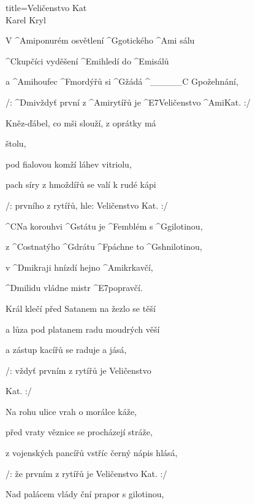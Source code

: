 \begin{song}{title=\predtitle\centering Veličenstvo Kat \\\large Karel Kryl  \vspace*{-0.3cm}}  %
\begin{centerjustified}

\begin{varwidth}[t]{0.55\textwidth}\setlength{\parindent}{\pindent}  %

\sloka
	V ^{Ami\z}ponurém osvětlení ^{G\z}gotického ^{Ami\,\,}sálu
 
	^{C\z}kupčíci vyděšení ^{Emi\z}hledí do ^{E}misálů

	a ^{Ami\z}houfec ^{F\z}mordýřů si ^{G\z}žádá ^{{\color{white}\_\_\_\_\_}C\,\,G}požehnání,
         
	/: ^{Dmi\z}vždyť první z ^{Ami\z}rytířů je ^{E7\z}Veličenstvo ^{Ami}Kat. :/

\sloka
	Kněz-ďábel, co mši slouží, z oprátky má 

	štolu,
	
	pod fialovou komží láhev vitriolu,
	
	pach síry z hmoždířů se valí k rudé kápi

	/: prvního z rytířů, hle: Veličenstvo Kat. :/
	
	
	^{C}Na korouhvi ^{G\z}státu je ^{F\z}emblém s ^{G}gilotinou,

	z ^{C\z}ostnatýho ^{G\z}drátu ^{F\z}páchne to ^{\z G}shnilotinou,

	v ^{Dmi\z}kraji hnízdí hejno ^{\z Ami}krkavčí,

	^{Dmi\z}lidu vládne mistr ^{\z E7}popravčí.

\sloka
	Král klečí před Satanem na žezlo se těší
   
	a lůza pod platanem radu moudrých věší

	a zástup kacířů se raduje a jásá,
 	
 	/: vždyť prvním z rytířů je Veličenstvo 

	Kat. :/

\sloka
	Na rohu ulice vrah o morálce káže,
   
	před vraty věznice se procházejí stráže,
  
	z vojenských pancířů vstříc černý nápis hlásá,
   
   	/: že prvním z rytířů je Veličenstvo Kat. :/
   	
	Nad palácem vlády ční prapor s gilotinou,
 

\end{varwidth}
\end{centerjustified}
\end{song}
